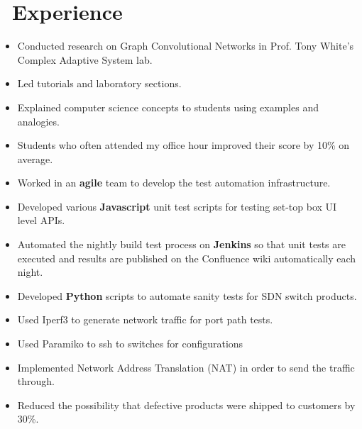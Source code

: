 \documentclass{resume}
\begin{document}
\section{\faCogs\ Experience}
{}
\begin{itemize}
	\item Conducted research on Graph Convolutional Networks in Prof. Tony White's Complex Adaptive System lab.
	\item Led tutorials and laboratory sections. 
	\item Explained computer science concepts to students using examples and analogies. 
	\item Students who often attended my office hour improved their score by 10\% on average.  
\end{itemize}

\begin{itemize}
	\item Worked in an \textbf{agile} team to develop the test automation infrastructure.
	\item Developed various \textbf{Javascript} unit test scripts for testing set-top box UI level APIs.
	\item Automated the nightly build test process on \textbf{Jenkins} so that unit tests are executed and results are published on the Confluence wiki automatically each night.
\end{itemize}

\begin{itemize}
	\item Developed \textbf{Python} scripts to automate sanity tests for SDN switch products.
	\item Used Iperf3 to generate network traffic for port path tests.
	\item Used Paramiko to ssh to switches for configurations
	\item Implemented Network Address Translation (NAT) in order to send the traffic through.  
	\item Reduced the possibility that defective products were shipped to customers by 30\%.
\end{itemize}
\end{document}
